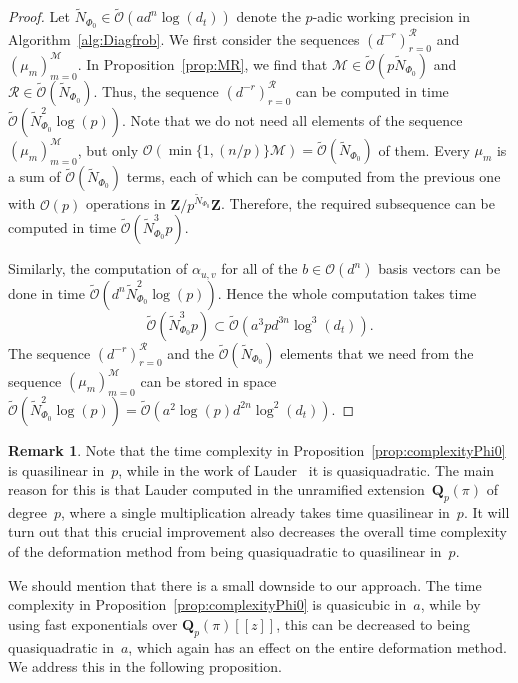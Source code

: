 \documentclass[a4paper,11pt]{article}
\numberwithin{equation}{section}
\newcommand{\ZZ}{\mathbf{Z}} %
\newcommand{\QQ}{\mathbf{Q}} %
\providecommand{\BigOh}{\mathcal{O}}          %
\providecommand{\SoftOh}{\tilde{\mathcal{O}}} %
\theoremstyle{definition}
\newtheorem{rem}[thm]{Remark}
\begin{document}
\begin{proof}
Let $\tilde{N}_{\Phi_0} \in \SoftOh(a d^n \log(d_t))$ denote the $p$-adic working
precision in Algorithm~\ref{alg:Diagfrob}.  We first consider the 
sequences $(d^{-r})_{r=0}^{\mathcal{R}}$ and $(\mu_m)_{m=0}^{\mathcal{M}}$. 
In Proposition~\ref{prop:MR}, we find that 
$\mathcal{M} \in \SoftOh(p \tilde{N}_{\Phi_0})$ and 
$\mathcal{R} \in \SoftOh(\tilde{N}_{\Phi_0})$.  Thus, the sequence 
$(d^{-r})_{r=0}^{\mathcal{R}}$ can be computed in time 
$\SoftOh(\tilde{N}_{\Phi_0}^2 \log(p))$.  Note that we do not 
need all elements of the sequence $( \mu_{m} )_{m=0}^{\mathcal{M}}$, but only 
$\BigOh( \min \{ 1,(n/p) \} \mathcal{M} ) = \SoftOh(\tilde{N}_{\Phi_0})$ of 
them.  Every $\mu_m$ is a sum of $\SoftOh(\tilde{N}_{\Phi_0})$ terms, each of 
which can be computed from the previous one with $\BigOh(p)$ operations in 
$\ZZ/p^{\tilde{N}_{\Phi_0}}\ZZ$.  Therefore, the required subsequence can be computed 
in time $\SoftOh(\tilde{N}_{\Phi_0}^3 p)$.

Similarly, the computation of $\alpha_{u,v}$ for all of the 
$b \in \BigOh(d^n)$ basis vectors can be done in time 
$\SoftOh(d^n \tilde{N}_{\Phi_0}^2 \log(p))$.  Hence the whole computation 
takes time 
\[
\SoftOh(\tilde{N}_{\Phi_0}^3p) \subset \SoftOh(a^3 p d^{3n} \log^3(d_t)).
\]
The sequence $(d^{-r})_{r=0}^{\mathcal{R}}$ and the 
$\SoftOh(\tilde{N}_{\Phi_0})$ elements that we need from the sequence 
$(\mu_{m})_{m=0}^{\mathcal{M}}$ can be stored in space 
$\SoftOh(\tilde{N}_{\Phi_0}^2 \log(p)) = \SoftOh(a^2 \log(p) d^{2n} \log^2(d_t))$.
\end{proof}

\begin{rem}
Note that the time complexity in Proposition~\ref{prop:complexityPhi0} 
is quasilinear in~$p$, while in the work of Lauder~\citep{Lauder2004a} 
it is quasiquadratic.  The main reason for this is that Lauder computed 
in the unramified extension~$\QQ_p(\pi)$ of degree~$p$, where a single 
multiplication already takes time quasilinear in~$p$.  It will turn out 
that this crucial improvement also decreases the overall time complexity 
of the deformation method from being quasiquadratic to quasilinear in~$p$.

We should mention that there is a small downside to our approach.  The time 
complexity in Proposition~\ref{prop:complexityPhi0} is quasicubic in~$a$, 
while by using fast exponentials over $\QQ_p(\pi)[[z]]$, this can be 
decreased to being quasiquadratic in~$a$, which again has an effect on the 
entire deformation method.  We address this in the following proposition.
\end{rem}
\end{document}
